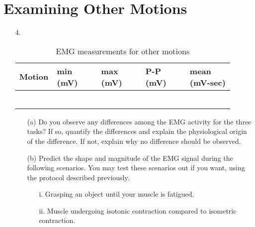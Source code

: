 \documentclass{article}
\begin{document}
\section*{Examining Other Motions}
\begin{itemize}
	\item[4.]
	\begin{table}[h!]
	\centering
	\caption{EMG measurements for other motions}
	\begin{tabular}[h!]{p{0.1\linewidth}|p{0.2\linewidth}p{0.2\linewidth}p{0.2\linewidth}p{0.2\linewidth}}
	\toprule
	Motion & min (mV) & max (mV) & P-P (mV) & mean (mV-sec)\\
	\midrule
	& & & &\\& & & &\\
	\midrule
	& & & &\\& & & &\\
	\midrule
	& & & &\\& & & &\\
	\bottomrule
	\end{tabular}
	\end{table}
	\begin{itemize}
		\item[(a)] Do you observe any differences among the EMG activity for the three tasks? If so, quantify the differences and explain the physiological origin of the difference. If not, explain why no difference should be observed.\vspace{4cm}
		\item[(b)] Predict the shape and magnitude of the EMG signal during the following scenarios. You may test these scenarios out if you want, using the protocol described previously.
		\begin{itemize}
			\item[i.] Grasping an object until your muscle is fatigued.\vspace{7cm}
			\item[ii.] Muscle undergoing isotonic contraction compared to isometric contraction.
		\end{itemize}
	\end{itemize}
\end{itemize}
\end{document}
